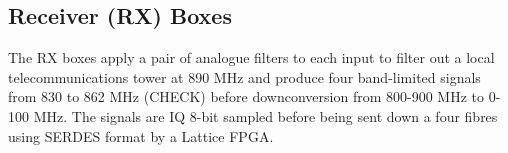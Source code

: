 \subsection{Receiver (RX) Boxes}
The RX boxes apply a pair of analogue filters to each input to filter out a local telecommunications tower at 890 MHz and produce four band-limited signals from 830 to 862 MHz (CHECK) before downconversion from 800-900 MHz to 0-100 MHz. The signals are IQ 8-bit sampled before being sent down a four fibres using SERDES format by a Lattice FPGA.
